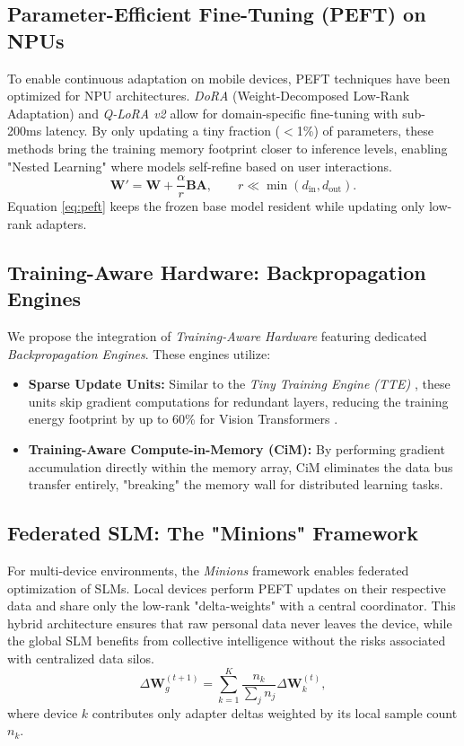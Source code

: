 \documentclass[twocolumn,10pt]{article}
\begin{document}
\subsection{Parameter-Efficient Fine-Tuning (PEFT) on NPUs}
To enable continuous adaptation on mobile devices, PEFT techniques have been optimized for NPU architectures. \textit{DoRA} (Weight-Decomposed Low-Rank Adaptation) \cite{dora2024} and \textit{Q-LoRA v2} allow for domain-specific fine-tuning with sub-200ms latency. By only updating a tiny fraction ($<$1\%) of parameters, these methods bring the training memory footprint closer to inference levels, enabling "Nested Learning" \cite{nested2026} where models self-refine based on user interactions.
\begin{equation}
\mathbf{W}'=\mathbf{W}+\frac{\alpha}{r}\mathbf{B}\mathbf{A},
\qquad
r\ll\min(d_{\mathrm{in}},d_{\mathrm{out}}).
\label{eq:peft}
\end{equation}
Equation \ref{eq:peft} keeps the frozen base model resident while updating only low-rank adapters.

\subsection{Training-Aware Hardware: Backpropagation Engines}
We propose the integration of \textit{Training-Aware Hardware} featuring dedicated \textit{Backpropagation Engines}. These engines utilize:
\begin{itemize}
    \item \textbf{Sparse Update Units:} Similar to the \textit{Tiny Training Engine (TTE)} \cite{tte2024}, these units skip gradient computations for redundant layers, reducing the training energy footprint by up to 60\% for Vision Transformers \cite{tinytrain2025}.
    \item \textbf{Training-Aware Compute-in-Memory (CiM):} By performing gradient accumulation directly within the memory array, CiM eliminates the data bus transfer entirely, "breaking" the memory wall for distributed learning tasks.
\end{itemize}

\subsection{Federated SLM: The "Minions" Framework}
For multi-device environments, the \textit{Minions} framework \cite{minions2025} enables federated optimization of SLMs. Local devices perform PEFT updates on their respective data and share only the low-rank "delta-weights" with a central coordinator. This hybrid architecture ensures that raw personal data never leaves the device, while the global SLM benefits from collective intelligence without the risks associated with centralized data silos.
\begin{equation}
\Delta\mathbf{W}_{g}^{(t+1)}
=\sum_{k=1}^{K}\frac{n_k}{\sum_j n_j}\Delta\mathbf{W}_{k}^{(t)},
\label{eq:federated_delta}
\end{equation}
where device $k$ contributes only adapter deltas weighted by its local sample count $n_k$.
\end{document}
